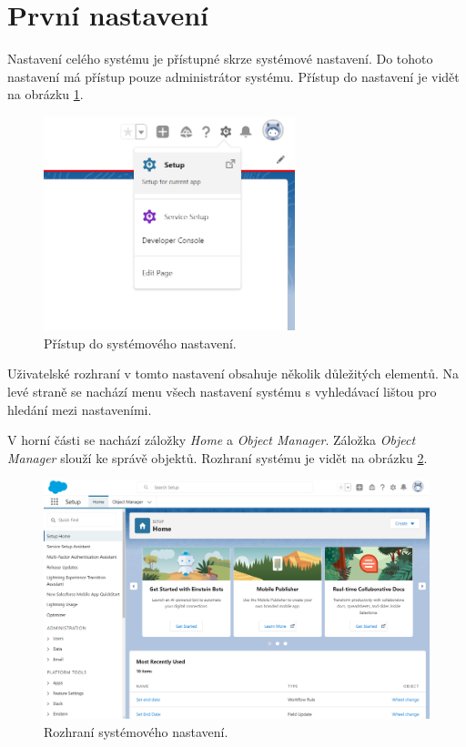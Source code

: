 \section{První nastavení}
Nastavení celého systému je přístupné skrze systémové nastavení. Do tohoto nastavení má přístup pouze administrátor systému. Přístup do nastavení je vidět na obrázku \ref{fig:Setup_Access}.

\begin{figure}[h!]
    \centering
    \includegraphics[width=0.65\textwidth]{assets/7_implementace/první_nastavení/Setup.png}
    \caption{Přístup do systémového nastavení.}
    \label{fig:Setup_Access}
\end{figure}

Uživatelské rozhraní v tomto nastavení obsahuje několik důležitých elementů. Na levé straně se nachází menu všech nastavení systému s vyhledávací lištou pro hledání mezi nastaveními. 

V horní části se nachází záložky \emph{Home} a \emph{Object Manager}. Záložka \emph{Object Manager} slouží ke správě objektů. Rozhraní systému je vidět na obrázku \ref{fig:Setup_UI}.

\begin{figure}[h!]
    \centering
    \includegraphics[width=\textwidth]{assets/7_implementace/první_nastavení/setup UI.png}
    \caption{Rozhraní systémového nastavení.}
    \label{fig:Setup_UI}
\end{figure}
\FloatBarrier
